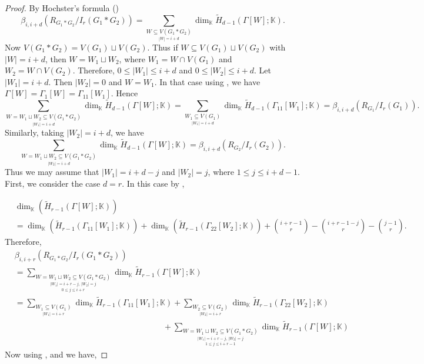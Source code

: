 \documentclass[10pt,a4paper]{amsart}
\newcommand{\K}{\mathbb K}
\begin{document}
\begin{proof}
    By Hochster's formula ()
    {\footnotesize
    \[
\beta_{i,i+d}(R_{G_1*G_2}/I_r(G_1*G_2))= \sum_{\underset{|W|=i+d}{W \subseteq V(G_1*G_2) }} \dim_{\mathbb{K}} \widetilde{H}_{d-1}(\Gamma[W]; \mathbb{K}).
\]
}
\noindent
 Now $V(G_1*G_2)=V(G_1)\sqcup V(G_2)$. Thus if $W\subseteq V(G_1)\sqcup V(G_2)$ with $|W|=i+d$, then $W=W_1\sqcup W_2$, where $W_1=W\cap V(G_1)$ and $W_2=W\cap V(G_2)$. Therefore, $0\le |W_1|\le i+d$ and $0\le |W_2|\le i+d$. Let $|W_1|=i+d$. Then $|W_2|=0$ and $W=W_1$. In that case using , we have $\Gamma[W]=\Gamma_1[W]=\Gamma_{11}[W_1]$. Hence
 {\footnotesize
 \begin{equation}\label{eqnew1}
 \sum_{\underset{|W_1|=i+d}{W=W_1\sqcup W_2 \subseteq V(G_1*G_2) }} \dim_{\mathbb{K}} \widetilde{H}_{d-1}(\Gamma[W]; \mathbb{K})=\sum_{\underset{|W_1|=i+d}{W_1 \subseteq V(G_1) }} \dim_{\mathbb{K}} \widetilde{H}_{d-1}(\Gamma_{11}[W_1]; \mathbb{K})=\beta_{i,i+d}(R_{G_1}/I_r(G_1)).
  \end{equation}}
 \noindent
 Similarly, taking $|W_2|=i+d$, we have 
 {\footnotesize
 \begin{equation}\label{eqnew2}
  \sum_{\underset{|W_2|=i+d}{W=W_1\sqcup W_2 \subseteq V(G_1*G_2) }} \dim_{\mathbb{K}} \widetilde{H}_{d-1}(\Gamma[W]; \mathbb{K})=\beta_{i,i+d}(R_{G_2}/I_r(G_2)).
 \end{equation}}
 \noindent
Thus we may assume that $|W_1|=i+d-j$ and $|W_2|=j$, where $1\le j\le i+d-1$. First, we consider the case $d=r$. In this case by ,

{\footnotesize
    \begin{equation}\label{eqnew3}
    \begin{split}
     &\dim_{\K}(\widetilde H_{r-1}(\Gamma[W];\K))\\
     &=\dim_{\K}(\widetilde H_{r-1}(\Gamma_{11}[W_1];\K))+\dim_{\K}(\widetilde H_{r-1}(\Gamma_{22}[W_2];\K))+{i+r-1\choose r}-{i+r-1-j\choose r}-{j-1\choose r}.   
    \end{split}
    \end{equation}
    }
    Therefore,
    {\footnotesize
    \begin{align*}
       &\beta_{i,i+r}(R_{G_1*G_2}/I_r(G_1*G_2))\\
       &=\sum_{\underset{0\le j\le i+r}{\underset{|W_1|=i+r-j,\,|W_2|=j}{W=W_1\sqcup W_2 \subseteq V(G_1*G_2) }}} \dim_{\mathbb{K}} \widetilde{H}_{r-1}(\Gamma[W]; \mathbb{K})\\
       &=\sum_{\underset{|W_1|=i+r}{W_1 \subseteq V(G_1) }} \dim_{\mathbb{K}} \widetilde{H}_{r-1}(\Gamma_{11}[W_1]; \mathbb{K})+\sum_{\underset{|W_2|=i+r}{W_2 \subseteq V(G_2) }} \dim_{\mathbb{K}} \widetilde{H}_{r-1}(\Gamma_{22}[W_2]; \mathbb{K})\\
       &\hspace{18em}+\sum_{\underset{1\le j\le i+r-1}{\underset{|W_1|=i+r-j,\,|W_2|=j}{W=W_1\sqcup W_2 \subseteq V(G_1*G_2) }}} \dim_{\mathbb{K}} \widetilde{H}_{r-1}(\Gamma[W]; \mathbb{K})
       \end{align*}}
Now using ,  and  we have,


\end{proof}
\end{document}
